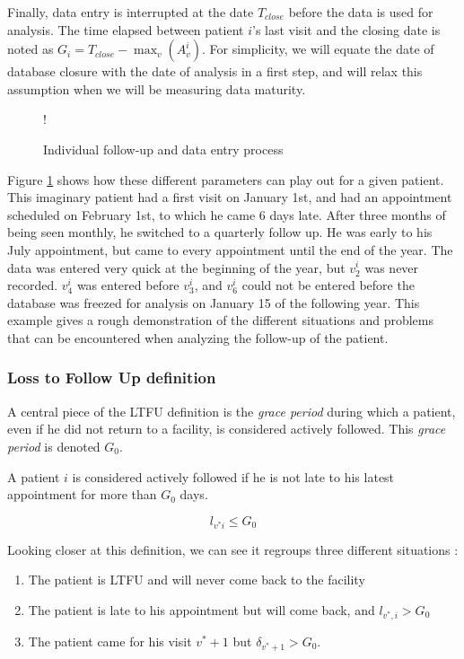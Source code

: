 Finally, data entry is interrupted at the date $T_{close}$ before the data is used for analysis. The time elapsed between patient $i$'s last visit and the closing date is noted as $G_i = T_{close} - \max_v(A_v^i)$. For simplicity, we will equate the date of database closure with the date of analysis in a first step, and will relax this assumption when we will be measuring data maturity.


\begin{center}
 \begin {figure}[ht]
        \centering
\resizebox{\linewidth} {!} {

}
\caption{Individual follow-up and data entry process}
\label{fig:timeline-followup}
\end{figure}
\end{center}

Figure \ref{fig:timeline-followup} shows how these different parameters can play out for a given patient. This imaginary patient had a first visit on January 1st, and had an appointment scheduled on February 1st, to which he came 6 days late. After three months of being seen monthly, he switched to a quarterly follow up. He was early to his July appointment, but came to every appointment until the end of the year. The data was entered very quick at the beginning of the year, but $v_2^i$ was never recorded. $v_4^i$ was entered before $v_3^i$, and $v_6^i$ could not be entered before the database was freezed for analysis on January 15 of the following year. This example gives a rough demonstration of the different situations and problems that can be encountered when analyzing the follow-up of the patient.

\subsubsection{Loss to Follow Up definition}

A central piece of the LTFU definition is the  \textit{grace period} during which a patient, even if he did not return to a facility, is considered actively followed. This \textit{grace period} is denoted $G_0$.

A patient $i$ is considered actively followed if he is not late to his latest appointment for more than $G_0$ days.

$$l_{v^{*}i} \leq  G_0$$

Looking closer at this definition, we can see it regroups three different situations :
\begin{enumerate}
\item The patient is LTFU and will never come back to the facility
\item The patient is late to his appointment but will come back, and $l_{v^{*},i} > G_0$
\item The patient came for his visit $v^{*} + 1$ but $\delta_{v^*+1} > G_0$.
\end{enumerate}

